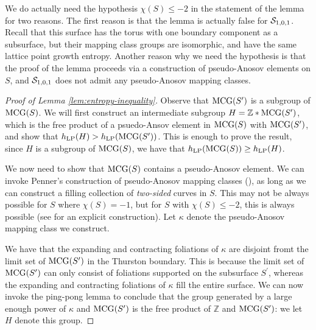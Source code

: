 \documentclass[12pt, reqno]{amsart}
\begin{document}
\begin{rem}
  We do actually need the hypothesis $\chi(S) \leq -2$ in the statement of the lemma for two reasons.
  The first reason is that the lemma is actually false for $\mathcal{S}_{1,0,1}$.
  Recall that this surface has the torus with one boundary component as a subsurface, but their mapping class groups are isomorphic, and have the same lattice point growth entropy.
  Another reason why we need the hypothesis is that the proof of the lemma proceeds via a construction of pseudo-Anosov elements on $S$, and $\mathcal{S}_{1,0,1}$ does not admit any pseudo-Anosov mapping classes.
\end{rem}

\begin{proof}[Proof of Lemma \ref{lem:entropy-inequality}]
  Observe that $\mathrm{MCG}(S^{\prime})$ is a subgroup of $\mathrm{MCG}(S)$.
  We will first construct an intermediate subgroup $H = \mathbb{Z} * \mathrm{MCG}(S^{\prime})$, which is the free product of a psuedo-Ansov element in $\mathrm{MCG}(S)$ with $\mathrm{MCG}(S^{\prime})$, and show that $h_{\mathrm{LP}}(H) > h_{\mathrm{LP}}(\mathrm{MCG}(S^{\prime}))$.
  This is enough to prove the result, since $H$ is a subgroup of $\mathrm{MCG}(S)$, we have that $h_{\mathrm{LP}}(\mathrm{MCG}(S)) \geq h_{\mathrm{LP}}(H)$.

  We now need to show that $\mathrm{MCG}(S)$ contains a pseudo-Anosov element.
  We can invoke Penner's construction of pseudo-Anosov mapping classes (\cite[Theorem 4.1]{penner1988construction}), as long as we can construct a filling collection of \emph{two-sided} curves in $S$.
  This may not be always possible for $S$ where $\chi(S) = -1$, but for $S$ with $\chi(S) \leq -2$, this is always possible (see \textcite{khan2023pseudo} for an explicit construction).
  Let $\kappa$ denote the pseudo-Anosov mapping class we construct.

  We have that the expanding and contracting foliations of $\kappa$ are disjoint fromt the limit set of $\mathrm{MCG}(S^{\prime})$ in the Thurston boundary.
  This is because the limit set of $\mathrm{MCG}(S^{\prime})$ can only consist of foliations supported on the subsurface $S^{\prime}$, whereas the expanding and contracting foliations of $\kappa$ fill the entire surface.
  We can now invoke the ping-pong lemma to conclude that the group generated by a large enough power of $\kappa$ and $\mathrm{MCG}(S^{\prime})$ is the free product of $\mathbb{Z}$ and $\mathrm{MCG}(S^{\prime})$: we let $H$ denote this group.


\end{proof}
\end{document}
